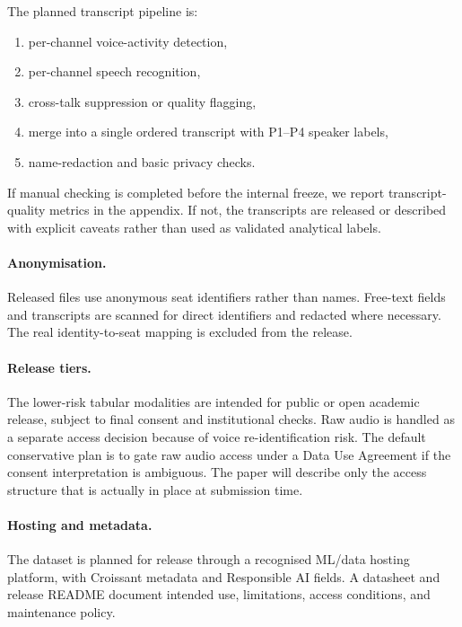 \documentclass{article}
\begin{document}
The planned transcript pipeline is:
\begin{enumerate}
  \item per-channel voice-activity detection,
  \item per-channel speech recognition,
  \item cross-talk suppression or quality flagging,
  \item merge into a single ordered transcript with P1--P4 speaker labels,
  \item name-redaction and basic privacy checks.
\end{enumerate}

If manual checking is completed before the internal freeze, we report
transcript-quality metrics in the appendix.
If not, the transcripts are released or described with explicit caveats rather
than used as validated analytical labels.

\paragraph{Anonymisation.}
Released files use anonymous seat identifiers rather than names.
Free-text fields and transcripts are scanned for direct identifiers and
redacted where necessary.
The real identity-to-seat mapping is excluded from the release.

\paragraph{Release tiers.}
The lower-risk tabular modalities are intended for public or open academic
release, subject to final consent and institutional checks.
Raw audio is handled as a separate access decision because of
voice re-identification risk.
The default conservative plan is to gate raw audio access under a Data Use
Agreement if the consent interpretation is ambiguous.
The paper will describe only the access structure that is actually in place at
submission time.

\paragraph{Hosting and metadata.}
The dataset is planned for release through a recognised ML/data hosting
platform, with Croissant metadata and Responsible AI fields.
A datasheet and release README document intended use, limitations, access
conditions, and maintenance policy.
\end{document}
